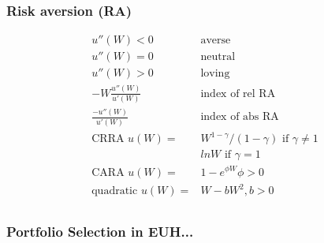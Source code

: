 \documentclass[a4paper,12pt]{article}
\begin{document}
\begin{multicols}{2}
\subsubsection*{Risk aversion (RA)}
\[
\begin{array}{rl}
u''(W) < 0 &\mbox{averse}\\
u''(W) = 0 &\mbox{neutral}\\
u''(W) > 0 &\mbox{loving}\\
-W\frac{u''(W)}{u'(W)} &\mbox{index of rel RA}\\
\frac{-u''(W)}{u'(W)} &\mbox{index of abs RA}\\
\mbox{CRRA }u(W) =  &W^{1-\gamma}/(1-\gamma) \mbox{ if } \gamma \ne 1\\
                    &lnW \mbox{ if } \gamma = 1\\
\mbox{CARA }u(W) =& 1-e^{\phi W} \phi > 0\\
\mbox{quadratic }u(W) =&W - bW^2, b>0\\
\end{array}
\]

\subsubsection*{Portfolio Selection in EUH...}


\end{multicols}
\end{document}
